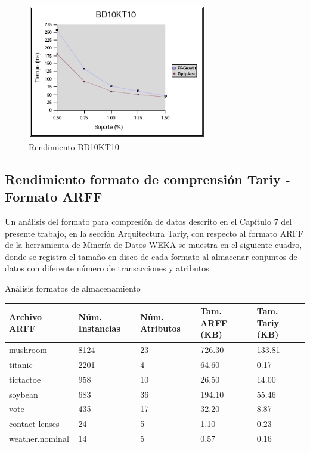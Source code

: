 \begin{figure}[h]
\centering
\includegraphics[width=0.7\textwidth]{images/bd10kt102.png}
\caption{Rendimiento BD10KT10}
\label{10k2}
\end{figure}

\newpage

\subsection{Rendimiento formato de comprensi\'on Tariy - Formato ARFF}

Un an\'alisis del formato para compresi\'on de datos descrito en el Cap\'itulo 7 del presente trabajo, en la
secci\'on Arquitectura Tariy, con respecto al formato ARFF de la herramienta de Miner\'ia de Datos WEKA se
muestra en el siguiente cuadro, donde se registra el tama\~no en disco de cada formato al almacenar conjuntos de
datos con diferente n\'umero de transacciones y atributos.

\begin{table}[h]
\caption{An\'alisis formatos de almacenamiento}
\label{formatos}
\end{table}
\begin{center}
\begin{tabular}{|p{30mm}|p{20mm}|p{20mm}|p{20mm}|p{20mm}|} \hline
\textbf{Archivo ARFF}    & \textbf{N\'um. Instancias} & \textbf{N\'um. Atributos} & \textbf{Tam. ARFF (KB)} &
\textbf{Tam. Tariy (KB)}\\ \hline
mushroom        & 8124              & 23               & 726.30         & 133.81\\ \hline
titanic         & 2201              &  4               &  64.60         &   0.17\\ \hline
tictactoe       &  958              & 10               &  26.50         &  14.00\\ \hline
soybean         &  683              & 36               & 194.10         &  55.46\\ \hline
vote            &  435              & 17               &  32.20         &   8.87\\ \hline
contact-lenses  &   24              &  5               &   1.10         &   0.23\\ \hline
weather.nominal &   14              &  5               &   0.57         &   0.16\\ \hline
\end{tabular}
\end{center}

